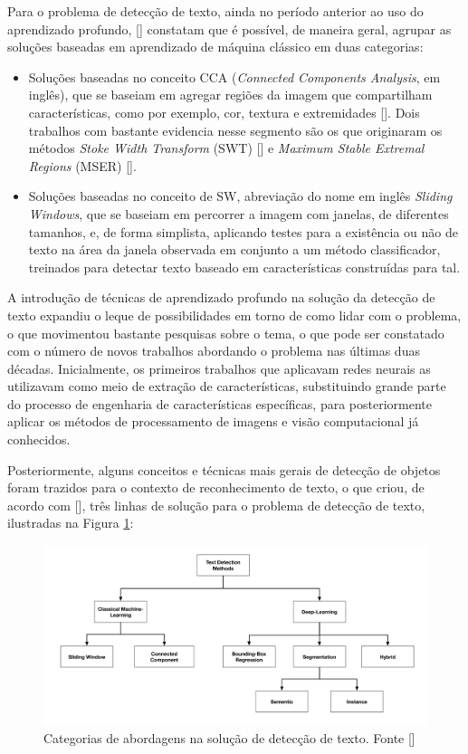 Para o problema de detecção de texto, ainda no período anterior ao uso do aprendizado profundo, [] constatam que é possível, de maneira geral, agrupar as soluções baseadas em aprendizado de máquina clássico em duas categorias:
\begin{itemize}
    \item Soluções baseadas no conceito CCA (\textit{Connected Components Analysis}, em inglês), que se baseiam em agregar regiões da imagem que compartilham características, como por exemplo, cor, textura e extremidades []. Dois trabalhos com bastante evidencia nesse segmento são os que originaram os métodos \textit{Stoke Width Transform} (SWT) [] e \textit{Maximum Stable Extremal Regions} (MSER) [].
    \item Soluções baseadas no conceito de SW, abreviação do nome em inglês \textit{Sliding Windows}, que se baseiam em percorrer a imagem com janelas, de diferentes tamanhos, e, de forma simplista, aplicando testes para a existência ou não de texto na área da janela observada em conjunto a um método classificador, treinados para detectar texto baseado em características construídas para tal.
\end{itemize}

A introdução de técnicas de aprendizado profundo na solução da detecção de texto expandiu o leque de possibilidades em torno de como lidar com o problema, o que movimentou bastante pesquisas sobre o tema, o que pode ser constatado com o número de novos trabalhos abordando o problema nas últimas duas décadas. Inicialmente, os primeiros trabalhos que aplicavam redes neurais as utilizavam como meio de extração de características, substituindo grande parte do processo de engenharia de características específicas, para posteriormente aplicar os métodos de processamento de imagens e visão computacional já conhecidos.

Posteriormente, alguns conceitos e técnicas mais gerais de detecção de objetos foram trazidos para o contexto de reconhecimento de texto, o que criou, de acordo com [], três linhas de solução para o problema de detecção de texto, ilustradas na Figura \ref{fig:theory-detection-categories}:

\begin{figure}
    \centering
    \includegraphics[width=\textwidth]{figs/theory-detection-categories.png}
    \caption{Categorias de abordagens na solução de detecção de texto. Fonte []}
    \label{fig:theory-detection-categories}
\end{figure}

